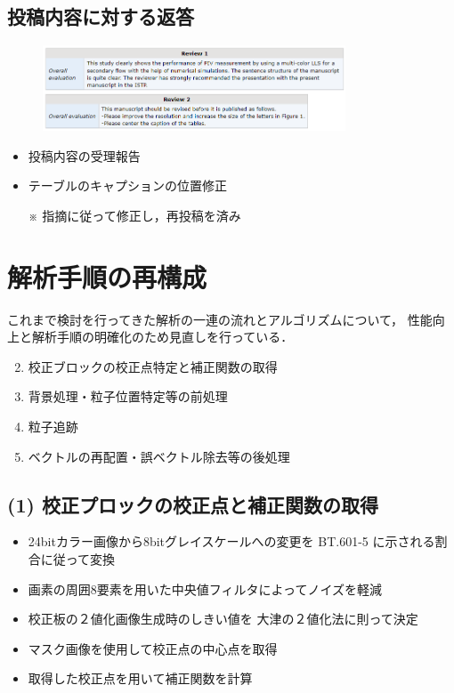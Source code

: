 \documentclass[twocolumn,a4j]{jsarticle}
\begin{document}
\subsection{投稿内容に対する返答}
\begin{figure}[htbp]
  \footnotesize
  \includegraphics[width=90mm]{../images/reviews.png}
\end{figure}

\begin{itemize}
  \item 投稿内容の受理報告
  \item テーブルのキャプションの位置修正
  \item [※] 指摘に従って修正し，再投稿を済み
\end{itemize}

\section{解析手順の再構成}
これまで検討を行ってきた解析の一連の流れとアルゴリズムについて，
性能向上と解析手順の明確化のため見直しを行っている．

\begin{enumerate}[(1)]
  \item [] \textgt{[ 全体の流れ ]}
  \item 校正ブロックの校正点特定と補正関数の取得
  \item 背景処理・粒子位置特定等の前処理
  \item 粒子追跡
  \item ベクトルの再配置・誤ベクトル除去等の後処理
\end{enumerate}

\subsection{(1) 校正プロックの校正点と補正関数の取得}
\begin{itemize}
  \item 24bitカラー画像から8bitグレイスケールへの変更を
        BT.601-5 に示される割合に従って変換
  \item 画素の周囲8要素を用いた中央値フィルタによってノイズを軽減
  \item 校正板の２値化画像生成時のしきい値を
        大津の２値化法に則って決定
  \item マスク画像を使用して校正点の中心点を取得
  \item 取得した校正点を用いて補正関数を計算
\end{itemize}
\end{document}
